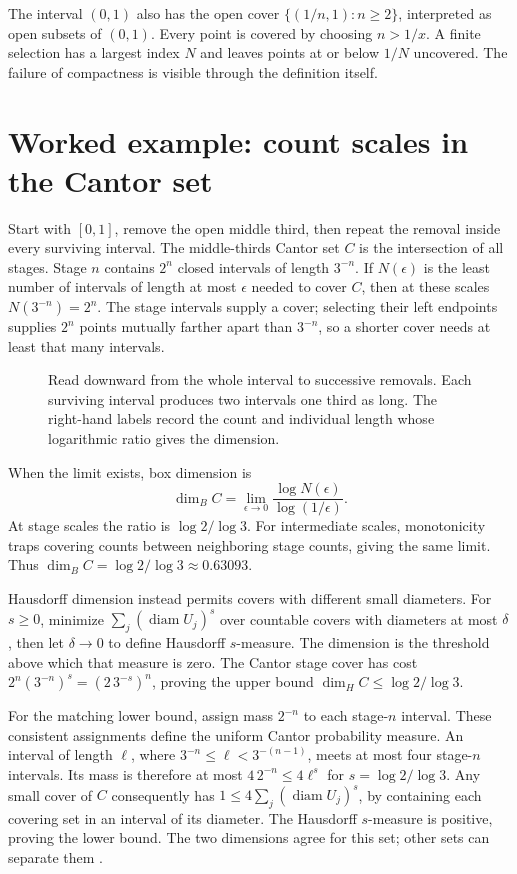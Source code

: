 The interval $(0,1)$ also has the open cover
$\{(1/n,1):n\geq2\}$, interpreted as open subsets of $(0,1)$.
Every point is covered by choosing $n>1/x$. A finite selection has a
largest index $N$ and leaves points at or below $1/N$ uncovered.
The failure of compactness is visible through the definition itself.

\section{Worked example: count scales in the Cantor set}
Start with $[0,1]$, remove the open middle third, then repeat the removal
inside every surviving interval. The middle-thirds Cantor set $C$ is the
intersection of all stages. Stage $n$ contains $2^n$ closed intervals of
length $3^{-n}$. If $N(\epsilon)$ is the least number of intervals of
length at most $\epsilon$ needed to cover $C$, then at these scales
$N(3^{-n})=2^n$. The stage intervals supply a cover; selecting their
left endpoints supplies $2^n$ points mutually farther apart than $3^{-n}$,
so a shorter cover needs at least that many intervals.

\begin{figure}[htbp]
  \centering
  
  \caption{Read downward from the whole interval to successive removals. Each surviving interval produces two intervals one third as long. The right-hand labels record the count and individual length whose logarithmic ratio gives the dimension.}
  \label{fig:learn:cantor_construction}
\end{figure}

When the limit exists, box dimension is
\[
 \dim_B C=\lim_{\epsilon\to0}
 \frac{\log N(\epsilon)}{\log(1/\epsilon)}.
\]
At stage scales the ratio is $\log2/\log3$. For intermediate scales,
monotonicity traps covering counts between neighboring stage counts, giving
the same limit. Thus $\dim_B C=\log2/\log3\approx0.63093$.

Hausdorff dimension instead permits covers with different small diameters.
For $s\geq0$, minimize $\sum_j(\operatorname{diam}U_j)^s$ over countable
covers with diameters at most $\delta$, then let $\delta\to0$ to define
Hausdorff $s$-measure. The dimension is the threshold above which that
measure is zero. The Cantor stage cover has cost
$2^n(3^{-n})^s=(2\,3^{-s})^n$, proving the upper bound
$\dim_H C\leq\log2/\log3$.

For the matching lower bound, assign mass $2^{-n}$ to each stage-$n$
interval. These consistent assignments define the uniform Cantor probability
measure. An interval of length $\ell$, where
$3^{-n}\leq\ell<3^{-(n-1)}$, meets at most four stage-$n$ intervals.
Its mass is therefore at most $4\,2^{-n}\leq4\ell^s$ for
$s=\log2/\log3$. Any small cover of $C$ consequently has
$1\leq4\sum_j(\operatorname{diam}U_j)^s$, by containing each covering
set in an interval of its diameter. The Hausdorff $s$-measure is positive,
proving the lower bound. The two dimensions agree for this set; other sets
can separate them \citep{falconer2004fractal}.

